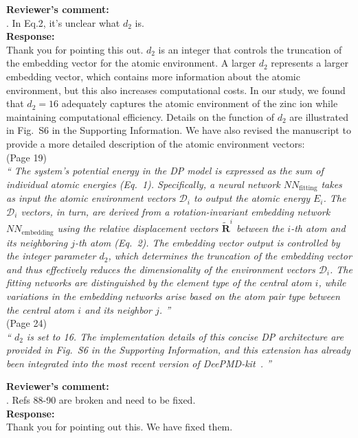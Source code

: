 \documentclass[doublespace,prb,aps,preprint]{revtex4}
\newcommand{\Quote}[1]{\textsl{``#1''}}
\newenvironment{Comment}{ {\bf \indent Reviewer's comment: \\} \setlength{\parindent}{1cm}  \sffamily }{ \ignorespacesafterend \\}
\newenvironment{Reply}{  {\bf Response: \\}  \setlength{\parindent}{1cm} \normalfont }{ \ignorespacesafterend \vspace{5mm}}
\newcommand{\HJ}[1]{\textcolor{red}{#1}}
\begin{document}
\begin{Comment}
5. In Eq.2, it’s unclear what $d_2$ is.
\end{Comment}
\begin{Reply}
    Thank you for pointing this out.
    $d_2$ is an integer that controls the truncation of the embedding vector for the atomic environment.
    A larger $d_2$ represents a larger embedding vector, which contains more information about the atomic environment,
    but this also increases computational costs.
    In our study, we found that $d_2 = 16$ adequately captures the atomic environment of the zinc ion while maintaining computational efficiency. 
    Details on the function of $d_2$ are illustrated in Fig.~S6 in the Supporting Information.    
    We have also revised the manuscript to provide a more detailed description of the atomic environment vectors: \\
    \newline
    (Page 19) \\
    \Quote{
        The system's potential energy in the DP model is expressed as the sum of individual atomic energies (Eq.~1).
        Specifically, a neural network $NN_{\text{fitting}}$ takes as input the atomic environment vectors $\mathcal{D}_{i}$ to output the atomic energy $E_i$. 
        The $\mathcal{D}_{i}$ vectors, in turn, are derived from a rotation-invariant embedding network $NN_{\text{embedding}}$ using the relative displacement vectors $\mathbf{\tilde{R}}^{i}$ between the $i$-th atom and its neighboring $j$-th atom (Eq.~2).
        The embedding vector output is controlled by the integer parameter $d_2$, which determines the truncation of the embedding vector and thus effectively reduces the dimensionality of the environment vectors $\mathcal{D}_{i}$.
        The fitting networks are distinguished by the element type of the central atom $i$, 
        while variations in the embedding networks arise based on the atom pair type between the central atom $i$ and its neighbor $j$. 
    } \\
    (Page 24) \\
    \Quote{
        $d_2$ is set to 16. The implementation details of this concise DP architecture are provided in Fig.~S6 in the Supporting Information, and this extension has already been integrated into the most recent version of DeePMD-kit~\cite{zeng2023deepmd}. 
    } 
\end{Reply}

\begin{Comment}
6. Refs 88-90 are broken and need to be fixed.
\end{Comment}
\begin{Reply}
Thank you for pointing out this. We have fixed them.
\end{Reply}




\end{document}
